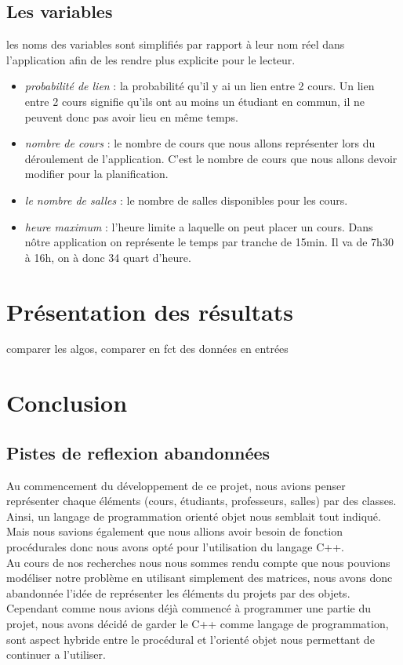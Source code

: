 \documentclass[a4paper,11pt]{article}
\begin{document}
	\subsection{Les variables}
	les noms des variables sont simplifiés par rapport à leur nom réel dans l'application afin de les rendre plus explicite pour le lecteur.
	\begin{itemize}
		\item \textit{probabilité de lien} : la probabilité qu'il y ai un lien entre 2 cours. Un lien entre 2 cours signifie qu'ils ont au moins un étudiant en commun, il ne peuvent donc pas avoir lieu en même temps.
		\item \textit{nombre de cours} : le nombre de cours que nous allons représenter lors du déroulement de l'application. C'est le nombre de cours que nous allons devoir modifier pour la planification.
		\item  \textit{le nombre de salles} : le nombre de salles disponibles pour les cours.
		\item \textit{heure maximum} : l'heure limite a laquelle on peut placer un cours. Dans nôtre application on représente le temps par tranche de 15min. Il va de 7h30 à 16h, on à donc 34 quart d'heure.
	\end{itemize}
\section{Présentation des résultats}
	comparer les algos, comparer en fct des données en entrées
	
\section{Conclusion}
	\subsection{Pistes de reflexion abandonnées}
	Au commencement du développement de ce projet, nous avions penser représenter chaque éléments (cours, étudiants, professeurs, salles) par des classes. Ainsi, un langage de programmation orienté objet nous semblait tout indiqué. Mais nous savions également que nous allions avoir besoin de fonction procédurales donc nous avons opté pour l'utilisation du langage C++.\\
	Au cours de nos recherches nous nous sommes rendu compte que nous pouvions modéliser notre problème en utilisant simplement des matrices, nous avons donc abandonnée l'idée de représenter les éléments du projets par des objets.\\
	Cependant comme nous avions déjà commencé à programmer une partie du projet, nous avons décidé de garder le C++ comme langage de programmation, sont aspect hybride entre le procédural et l'orienté objet nous permettant de continuer a l'utiliser.
\end{document}
